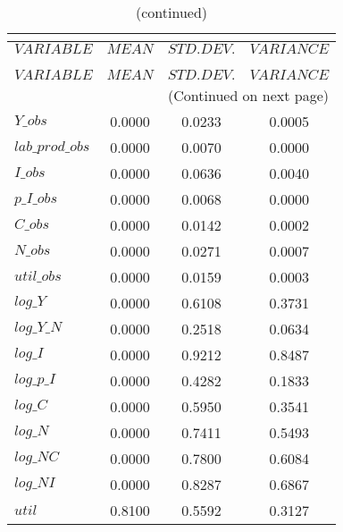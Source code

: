  
\begin{center}
\begin{longtable}{lccc} 
\caption{THEORETICAL MOMENTS}\\
 \label{Table:th_moments}\\
\toprule 
$VARIABLE        $	 & 	 $         MEAN$	 & 	 $    STD. DEV.$	 & 	 $     VARIANCE$\\
\midrule \endfirsthead 
\caption{(continued)}\\
 \toprule \\ 
$VARIABLE        $	 & 	 $         MEAN$	 & 	 $    STD. DEV.$	 & 	 $     VARIANCE$\\
\midrule \endhead 
\midrule \multicolumn{4}{r}{(Continued on next page)} \\ \bottomrule \endfoot 
\bottomrule \endlastfoot 
$Y\_obs          $	 & 	       0.0000	 & 	       0.0233	 & 	       0.0005 \\ 
$lab\_prod\_obs  $	 & 	       0.0000	 & 	       0.0070	 & 	       0.0000 \\ 
$I\_obs          $	 & 	       0.0000	 & 	       0.0636	 & 	       0.0040 \\ 
$p\_I\_obs       $	 & 	       0.0000	 & 	       0.0068	 & 	       0.0000 \\ 
$C\_obs          $	 & 	       0.0000	 & 	       0.0142	 & 	       0.0002 \\ 
$N\_obs          $	 & 	       0.0000	 & 	       0.0271	 & 	       0.0007 \\ 
$util\_obs       $	 & 	       0.0000	 & 	       0.0159	 & 	       0.0003 \\ 
$log\_Y          $	 & 	       0.0000	 & 	       0.6108	 & 	       0.3731 \\ 
$log\_Y\_N       $	 & 	       0.0000	 & 	       0.2518	 & 	       0.0634 \\ 
$log\_I          $	 & 	       0.0000	 & 	       0.9212	 & 	       0.8487 \\ 
$log\_p\_I       $	 & 	       0.0000	 & 	       0.4282	 & 	       0.1833 \\ 
$log\_C          $	 & 	       0.0000	 & 	       0.5950	 & 	       0.3541 \\ 
$log\_N          $	 & 	       0.0000	 & 	       0.7411	 & 	       0.5493 \\ 
$log\_NC         $	 & 	       0.0000	 & 	       0.7800	 & 	       0.6084 \\ 
$log\_NI         $	 & 	       0.0000	 & 	       0.8287	 & 	       0.6867 \\ 
${util}          $	 & 	       0.8100	 & 	       0.5592	 & 	       0.3127 \\ 
\end{longtable}
 \end{center}
